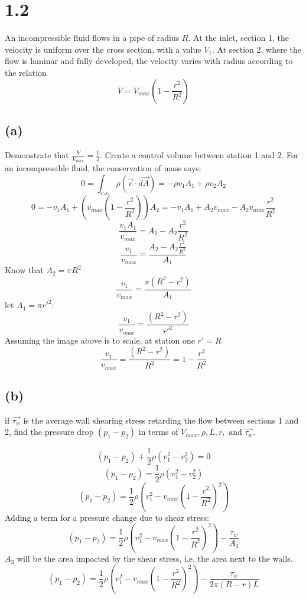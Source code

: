 \documentclass[preview,12pt]{article}
\begin{document}
\section*{1.2}
    An incompressible fluid flows in a pipe of radius $R$.  At the inlet, section 1, the velocity is uniform over the cross section, with a value $V_1$.  At section 2, where the flow is laminar and fully developed, the velocity varies with radius according to the relation
    $$V=V_{max}\left(1-\frac{r^2}{R^2}\right)$$
    \subsection*{(a)} 
        Demonstrate that $\frac{V}{V_{max}}=\frac{1}{2}$. \newline
        Create a control volume between station 1 and 2.  For an incompressible fluid, the conservation of mass says:
        $$0=\int_{c.s.}\rho(\vec{v}\cdot d\vec{A})=-\rho v_1 A_1+\rho v_2 A_2$$
        $$0=-v_1A_1+(v_{max}\left(1-\frac{r^2}{R^2}\right))A_2=-v_1A_1+A_2v_{max}-A_2v_{max}\frac{r^2}{R^2}$$
        $$\frac{v_1A_1}{v_{max}}=A_2-A_2\frac{r^2}{R^2}$$
        $$\frac{v_1}{v_{max}}=\frac{A_2-A_2\frac{r^2}{R^2}}{A_1}$$
        Know that $A_2=\pi R^2$
        $$\frac{v_1}{v_{max}}=\frac{\pi (R^2-r^2)}{A_1}$$
        let $A_1=\pi r'^2$:
        $$\frac{v_1}{v_{max}}=\frac{ (R^2-r^2)}{r'^2}$$
        Assuming the image above is to scale, at station one $r'=R$
        $$\frac{v_1}{v_{max}}=\frac{ (R^2-r^2)}{R^2}=1-\frac{r^2}{R^2}$$
        
    \subsection*{(b)} 
        if $\vec{\tau_w}$ is the average wall shearing stress retarding the flow between sections 1 and 2, find the pressure drop $(p_1-p_2)$ in terms of $V_{max}, \rho, L, r, \textrm{ and } \vec{\tau_w}$.
        
        $$(p_1-p_2)+\frac{1}{2}\rho(v_1^2-v_2^2)=0$$
        $$(p_1-p_2)=\frac{1}{2}\rho(v_1^2-v_2^2)$$
        $$(p_1-p_2)=\frac{1}{2}\rho(v_1^2-v_{max}\left(1-\frac{r^2}{R^2}\right)^2)$$
        Adding a term for a pressure change due to shear stress:
        $$(p_1-p_2)=\frac{1}{2}\rho(v_1^2-v_{max}\left(1-\frac{r^2}{R^2}\right)^2)-\frac{\tau_w}{A_3}$$
        $A_3$ will be the area impacted by the shear stress, i.e. the area next to the walls.
        $$(p_1-p_2)=\frac{1}{2}\rho(v_1^2-v_{max}\left(1-\frac{r^2}{R^2}\right)^2)-\frac{\tau_w}{2\pi(R-r)L}$$        
        
\end{document}
